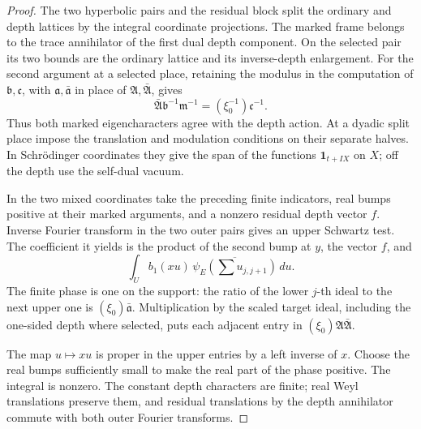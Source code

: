 \begin{proof}
The two hyperbolic pairs and the residual block split the ordinary
and depth lattices by the integral coordinate projections. The
marked frame belongs to the trace annihilator of the first dual
depth component. On the selected pair its two bounds are the
ordinary lattice and its inverse-depth enlargement. For the second
argument at a selected place, retaining the modulus in the computation
of \(\mathfrak b,\mathfrak c\), with \(\mathfrak a,\bar{\mathfrak a}\)
in place of \(\mathfrak A,\bar{\mathfrak A}\), gives
\[
       \bar{\mathfrak A}\mathfrak b^{-1}\mathfrak m^{-1}
                         =(\xi_0^{-1})\mathfrak c^{-1}.
\]
Thus both marked eigencharacters agree with the depth action.
At a dyadic split place impose the translation and modulation
conditions on their separate halves. In Schrödinger coordinates
they give the span of the functions \(\mathbf1_{t+I X}\) on \(X\);
off the depth use the self-dual vacuum.

In the two mixed coordinates take the preceding finite indicators,
real bumps positive at their marked arguments, and a nonzero
residual depth vector \(f\). Inverse Fourier transform in the two
outer pairs gives an upper Schwartz test. The coefficient it yields
is the product of the second bump at \(y\), the vector \(f\), and
\[
       \int_U b_1(xu)\,
             \overline{\psi_E(\textstyle\sum u_{j,j+1})}\,du .
\]
The finite phase is one on the support: the ratio of the lower
\(j\)-th ideal to the next upper one is \((\xi_0)\bar{\mathfrak a}\).
Multiplication by the scaled target ideal, including the one-sided
depth where selected, puts each adjacent entry in
\((\xi_0)\mathfrak A\bar{\mathfrak A}\).

The map \(u\mapsto xu\) is proper in the upper entries by a left
inverse of \(x\). Choose the real bumps sufficiently small to make
the real part of the phase positive. The integral is nonzero.
The constant depth characters are finite; real Weyl translations
preserve them, and residual translations by the depth annihilator
commute with both outer Fourier transforms.
\end{proof}

